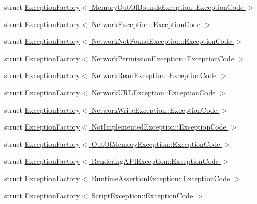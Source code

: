 \begin{DoxyCompactItemize}
\item 
struct \hyperlink{structMezzanine_1_1ExceptionFactory_3_01MemoryOutOfBoundsException_1_1ExceptionCode_01_4}{Exception\-Factory$<$ Memory\-Out\-Of\-Bounds\-Exception\-::\-Exception\-Code $>$}
\item 
struct \hyperlink{structMezzanine_1_1ExceptionFactory_3_01NetworkException_1_1ExceptionCode_01_4}{Exception\-Factory$<$ Network\-Exception\-::\-Exception\-Code $>$}
\item 
struct \hyperlink{structMezzanine_1_1ExceptionFactory_3_01NetworkNotFoundException_1_1ExceptionCode_01_4}{Exception\-Factory$<$ Network\-Not\-Found\-Exception\-::\-Exception\-Code $>$}
\item 
struct \hyperlink{structMezzanine_1_1ExceptionFactory_3_01NetworkPermissionException_1_1ExceptionCode_01_4}{Exception\-Factory$<$ Network\-Permission\-Exception\-::\-Exception\-Code $>$}
\item 
struct \hyperlink{structMezzanine_1_1ExceptionFactory_3_01NetworkReadException_1_1ExceptionCode_01_4}{Exception\-Factory$<$ Network\-Read\-Exception\-::\-Exception\-Code $>$}
\item 
struct \hyperlink{structMezzanine_1_1ExceptionFactory_3_01NetworkURLException_1_1ExceptionCode_01_4}{Exception\-Factory$<$ Network\-U\-R\-L\-Exception\-::\-Exception\-Code $>$}
\item 
struct \hyperlink{structMezzanine_1_1ExceptionFactory_3_01NetworkWriteException_1_1ExceptionCode_01_4}{Exception\-Factory$<$ Network\-Write\-Exception\-::\-Exception\-Code $>$}
\item 
struct \hyperlink{structMezzanine_1_1ExceptionFactory_3_01NotImplementedException_1_1ExceptionCode_01_4}{Exception\-Factory$<$ Not\-Implemented\-Exception\-::\-Exception\-Code $>$}
\item 
struct \hyperlink{structMezzanine_1_1ExceptionFactory_3_01OutOfMemoryException_1_1ExceptionCode_01_4}{Exception\-Factory$<$ Out\-Of\-Memory\-Exception\-::\-Exception\-Code $>$}
\item 
struct \hyperlink{structMezzanine_1_1ExceptionFactory_3_01RenderingAPIException_1_1ExceptionCode_01_4}{Exception\-Factory$<$ Rendering\-A\-P\-I\-Exception\-::\-Exception\-Code $>$}
\item 
struct \hyperlink{structMezzanine_1_1ExceptionFactory_3_01RuntimeAssertionException_1_1ExceptionCode_01_4}{Exception\-Factory$<$ Runtime\-Assertion\-Exception\-::\-Exception\-Code $>$}
\item 
struct \hyperlink{structMezzanine_1_1ExceptionFactory_3_01ScriptException_1_1ExceptionCode_01_4}{Exception\-Factory$<$ Script\-Exception\-::\-Exception\-Code $>$}

\end{DoxyCompactItemize}
